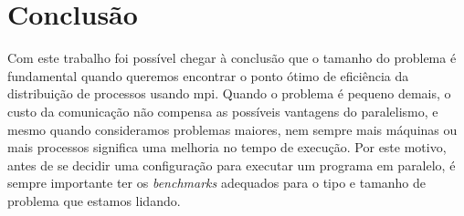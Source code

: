 \section{Conclusão}

Com este trabalho foi possível chegar à conclusão que o tamanho do problema é fundamental quando queremos
encontrar o ponto ótimo de eficiência da distribuição de processos usando \ac{mpi}. Quando o problema
é pequeno demais, o custo da comunicação não compensa as possíveis vantagens do paralelismo, e mesmo
quando consideramos problemas maiores, nem sempre mais máquinas ou mais processos significa uma melhoria
no tempo de execução. Por este motivo, antes de se decidir uma configuração para executar um programa em
paralelo, é sempre importante ter os \emph{benchmarks} adequados para o tipo e tamanho de problema que estamos
lidando.
